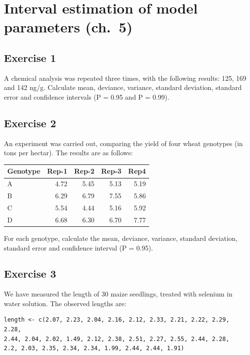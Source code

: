 \documentclass[a4paper,12pt,oneside]{book}
\begin{document}
\hypertarget{interval-estimation-of-model-parameters-ch.-5}{%
\section{Interval estimation of model parameters (ch.~5)}\label{interval-estimation-of-model-parameters-ch.-5}}

\hypertarget{exercise-1-3}{%
\subsection{Exercise 1}\label{exercise-1-3}}

A chemical analysis was repeated three times, with the following results: 125, 169 and 142 ng/g. Calculate mean, deviance, variance, standard deviation, standard error and confidence intervals (P = 0.95 and P = 0.99).

\hypertarget{exercise-2-3}{%
\subsection{Exercise 2}\label{exercise-2-3}}

An experiment was carried out, comparing the yield of four wheat genotypes (in tons per hectar). The results are as follows:

\begin{tabular}{l|r|r|r|r}
\hline
Genotype & Rep-1 & Rep-2 & Rep-3 & Rep4\\
\hline
A & 4.72 & 5.45 & 5.13 & 5.19\\
\hline
B & 6.29 & 6.79 & 7.55 & 5.86\\
\hline
C & 5.54 & 4.44 & 5.16 & 5.92\\
\hline
D & 6.68 & 6.30 & 6.70 & 7.77\\
\hline
\end{tabular}

For each genotype, calculate the mean, deviance, variance, standard deviation, standard error and confidence interval (P = 0.95).

\hypertarget{exercise-3-3}{%
\subsection{Exercise 3}\label{exercise-3-3}}

We have measured the length of 30 maize seedlings, treated with selenium in water solution. The observed lengths are:

\begin{verbatim}
length <- c(2.07, 2.23, 2.04, 2.16, 2.12, 2.33, 2.21, 2.22, 2.29, 2.28, 
2.44, 2.04, 2.02, 1.49, 2.12, 2.38, 2.51, 2.27, 2.55, 2.44, 2.28, 
2.2, 2.03, 2.35, 2.34, 2.34, 1.99, 2.44, 2.44, 1.91)
\end{verbatim}
\end{document}
